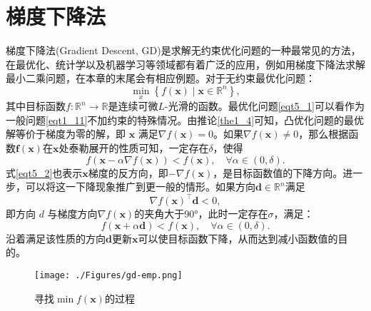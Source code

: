 \section{梯度下降法}梯度下降法(Gradient Descent, GD)是求解无约束优化问题的一种最常见的方法\cite{6302929}，在最优化、统计学以及机器学习等领域都有着广泛的应用，例如用梯度下降法求解最小二乘问题\cite{1989Least}，在本章的末尾会有相应例题。对于无约束最优化问题：
\begin{equation}
    \min _{x}\left\{f(\bm{x}) \mid \bm{x} \in \mathbb{R}^{n}\right\} ,
    \label{eqt5_1}
\end{equation}
其中目标函数$f: \mathbb{R}^{n} \rightarrow \mathbb{R}$是连续可微$L$-光滑的函数。最优化问题\ref{eqt5_1}可以看作为一般问题\ref{eqt1_11}不加约束的特殊情况。由推论\ref{the1_4}可知，凸优化问题的最优解等价于梯度为零的解，即 $\bm{x}$ 满足$\nabla f(\bm{x})=0$。如果$\nabla f(\bm{x}) \neq 0$，那么根据函数$\bm{f(\bm{x})}$在$\bm{x}$处泰勒展开的性质可知，一定存在$\delta$，使得
\begin{equation}
    f(\bm{x}-\alpha \nabla f(\bm{x}))<f(\bm{x}), \quad \forall \alpha \in(0, \delta) .
    \label{eqt5_2}
\end{equation}
式\ref{eqt5_2}也表示$\bm{x}$梯度的反方向，即$-\nabla f(\bm{x})$，是目标函数值的下降方向。进一步，可以将这一下降现象推广到更一般的情形。如果方向$\bm{d} \in \mathbb{R}^{n}$满足
\begin{equation}
    \nabla f(\bm{x})^{\top} \bm{d}<0 ,
    \nonumber
\end{equation}
即方向 $d$ 与梯度方向$\nabla f(\bm{x})$的夹角大于90°，此时一定存在$\sigma$，满足：
\begin{equation}
    f(\bm{x}+\alpha \bm{d})<f(\bm{x}), \quad \forall \alpha \in(0, \delta) .
    \label{eqt5_3}
\end{equation}
沿着满足该性质的方向$\bm{d}$更新$\bm{x}$可以使目标函数下降，从而达到减小函数值的目的。
\begin{figure}[hbtp]
    \centering
    \texttt{[image: ./Figures/gd-emp.png]}
    \caption{寻找$\min f(\bm{x})$的过程}
    \label{figure_gd_emp}
\end{figure}

